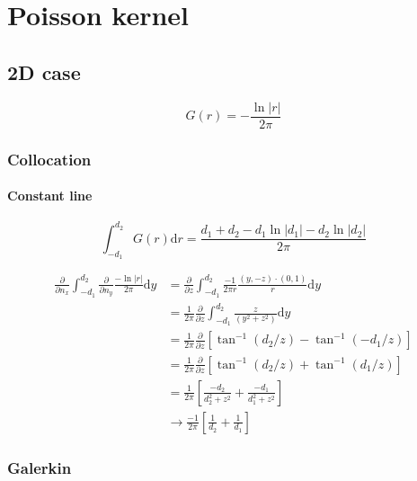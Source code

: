 \documentclass[a4paper,11pt]{article}
\newcommand{\td}{\mathrm{d}}
\begin{document}
\setcounter{tocdepth}{5}
\tableofcontents

\section{Poisson kernel}

\subsection{2D case}

\begin{equation}
G(r) = -\frac{\ln |r|}{2\pi}
\end{equation}

\subsubsection{Collocation}

\paragraph{Constant line}

\begin{equation}
\int_{-d_1}^{d_2} G(r) \td r
=
\frac{d_1 + d_2 - d_1 \ln |d_1| - d_2 \ln |d_2|}{2\pi}
\end{equation}

\begin{align}
\frac{\partial}{\partial n_x}
\int_{-d_1}^{d_2} 
\frac{\partial}{\partial n_y}
\frac{-\ln |r|}{2\pi}
\td y 
&=
\frac{\partial}{\partial z}
\int_{-d_1}^{d_2} 
\frac{-1}{2\pi r} \frac{(y, -z) \cdot (0,1)}{r}
\td y \nonumber \\
&=
\frac{1}{2\pi} \frac{\partial}{\partial z}
\int_{-d_1}^{d_2} 
\frac{z}{\left(y^2+z^2\right)}
\td y \nonumber \\
&=
\frac{1}{2\pi} \frac{\partial}{\partial z}
\left[
\tan^{-1}\left(d_2/z\right)
-
\tan^{-1}\left(-d_1/z\right)
\right]
\nonumber \\
&=
\frac{1}{2\pi} \frac{\partial}{\partial z}
\left[
\tan^{-1}\left(d_2/z\right) + \tan^{-1}\left(d_1/z\right)
\right]
\nonumber \\
&=
\frac{1}{2\pi} 
\left[
\frac{-d_2}{d_2^2+z^2} + \frac{-d_1}{d_1^2+z^2}
\right]
\nonumber \\
& \to
\frac{-1}{2\pi} 
\left[
\frac{1}{d_2} + \frac{1}{d_1}
\right]
\end{align}


\subsubsection{Galerkin}
\end{document}
